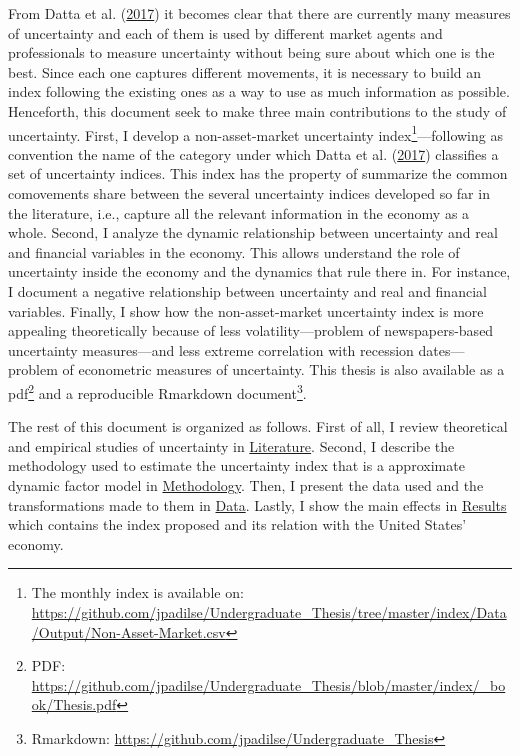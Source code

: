 \documentclass[12pt,twoside]{reedthesis}
\begin{document}
From Datta et al. (\protect\hyperlink{ref-dattetal:2017}{2017}) it becomes clear that there are currently many measures of uncertainty and each of them is used by different market agents and professionals to measure uncertainty without being sure about which one is the best. Since each one captures different movements, it is necessary to build an index following the existing ones as a way to use as much information as possible. Henceforth, this document seek to make three main contributions to the study of uncertainty. First, I develop a non-asset-market uncertainty index\footnote{The monthly index is available on: \url{https://github.com/jpadilse/Undergraduate_Thesis/tree/master/index/Data/Output/Non-Asset-Market.csv}}---following as convention the name of the category under which Datta et al. (\protect\hyperlink{ref-dattetal:2017}{2017}) classifies a set of uncertainty indices. This index has the property of summarize the common comovements share between the several uncertainty indices developed so far in the literature, i.e., capture all the relevant information in the economy as a whole. Second, I analyze the dynamic relationship between uncertainty and real and financial variables in the economy. This allows understand the role of uncertainty inside the economy and the dynamics that rule there in. For instance, I document a negative relationship between uncertainty and real and financial variables. Finally, I show how the non-asset-market uncertainty index is more appealing theoretically because of less volatility---problem of newspapers-based uncertainty measures---and less extreme correlation with recession dates---problem of econometric measures of uncertainty. This thesis is also available as a pdf\footnote{PDF: \url{https://github.com/jpadilse/Undergraduate_Thesis/blob/master/index/_book/Thesis.pdf}} and a reproducible Rmarkdown document\footnote{Rmarkdown: \url{https://github.com/jpadilse/Undergraduate_Thesis}}.

The rest of this document is organized as follows. First of all, I review theoretical and empirical studies of uncertainty in \protect\hyperlink{literature}{Literature}. Second, I describe the methodology used to estimate the uncertainty index that is a approximate dynamic factor model in \protect\hyperlink{methodology}{Methodology}. Then, I present the data used and the transformations made to them in \protect\hyperlink{data}{Data}. Lastly, I show the main effects in \protect\hyperlink{results}{Results} which contains the index proposed and its relation with the United States' economy.
\end{document}
